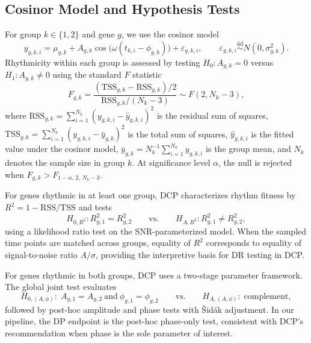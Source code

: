 \documentclass{article}
\begin{document}
\subsection{Cosinor Model and Hypothesis Tests}
\label{sec:cosinor_tests}

For group $k\in\{1,2\}$ and gene $g$, we use the cosinor model
\begin{equation}
y_{g,k,i}
=
\mu_{g,k}
+
A_{g,k}\cos\!\bigl(\omega(t_{k,i}-\phi_{g,k})\bigr)
+
\varepsilon_{g,k,i},
\qquad
\varepsilon_{g,k,i}\overset{\text{iid}}{\sim}N(0,\sigma_{g,k}^2).
\label{eq:cosinor_model}
\end{equation}
Rhythmicity within each group is assessed by testing
$H_0:A_{g,k}=0$ versus $H_1:A_{g,k}\neq 0$ using the standard $F$ statistic
\begin{equation}
F_{g,k}
=
\frac{(\mathrm{TSS}_{g,k}-\mathrm{RSS}_{g,k})/2}
{\mathrm{RSS}_{g,k}/(N_k-3)}
\sim F(2,N_k-3),
\label{eq:rhythm_f_test}
\end{equation}
where $\mathrm{RSS}_{g,k}=\sum_{i=1}^{N_k}(y_{g,k,i}-\hat y_{g,k,i})^2$ is the
residual sum of squares, $\mathrm{TSS}_{g,k}=\sum_{i=1}^{N_k}(y_{g,k,i}-\bar
y_{g,k})^2$ is the total sum of squares, $\hat y_{g,k,i}$ is the fitted value
under the cosinor model, $\bar y_{g,k}=N_k^{-1}\sum_{i=1}^{N_k} y_{g,k,i}$ is
the group mean, and $N_k$ denotes the sample size in group $k$.
At significance level $\alpha$, the null is rejected when
$F_{g,k}>F_{1-\alpha,\,2,\,N_k-3}$.

For genes rhythmic in at least one group, DCP characterizes rhythm fitness by
$R^2=1-\mathrm{RSS}/\mathrm{TSS}$ and tests
\begin{equation}
H_{0,R^2}: R_{g,1}^2 = R_{g,2}^2
\qquad \text{vs.} \qquad
H_{A,R^2}: R_{g,1}^2 \neq R_{g,2}^2,
\label{eq:dr_r2_hyp}
\end{equation}
using a likelihood ratio test on the SNR-parameterized model.
When the sampled time points are matched across groups, equality of $R^2$
corresponds to equality of signal-to-noise ratio $A/\sigma$, providing the
interpretive basis for DR testing in DCP.

For genes rhythmic in both groups, DCP uses a two-stage parameter framework.
The global joint test evaluates
\begin{equation}
H_{0,(A,\phi)}:\; A_{g,1}=A_{g,2}\ \text{and}\ \phi_{g,1}=\phi_{g,2}
\qquad \text{vs.} \qquad
H_{A,(A,\phi)}:\; \text{complement},
\label{eq:dp_hyp}
\end{equation}
followed by post-hoc amplitude and phase tests with \v{S}id\'{a}k adjustment.
In our pipeline, the DP endpoint is the post-hoc phase-only test, consistent
with DCP’s recommendation when phase is the sole parameter of interest.
\end{document}
